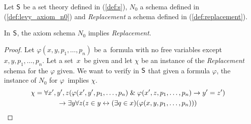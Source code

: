 Let $\sf{S}$ be a set theory defined in (\ref{def:s}), $N_0$ a schema defined in (\ref{def:levy_axiom_n0}) and \emph{Replacement} a schema defined in (\ref{def:replacement}).
\begin{theorem} 
In $\sf{S}$, the axiom schema $N_0$ implies \emph{Replacement}.
\end{theorem}
\begin{proof}
Let $\varphi(x, y, p_1, \ldots, p_n)$ be a~formula with no free variables except $x, y, p_1, \ldots, p_n$.
Let a set~$x$~be given and let $\chi$ be an instance of the \emph{Replacement} schema for the $\varphi$ given.
We want to verify in $\sf{S}$ that given a formula $\varphi$, the instance of $N_0$ for $\varphi$ implies $\chi$.
\begin{equation}
\begin{gathered}
\chi = \forall x', y', z(\varphi(x', y', p_1, \ldots, p_n) \mathrel{\&} \varphi(x', z, p_1, \ldots, p_n) \rightarrow y' = z') \\
\rightarrow \exists y \forall z (z \in y \leftrightarrow (\exists q \in x)(\varphi(x, y, p_1, \ldots, p_n)))
\end{gathered}
\end{equation}


\end{proof}
